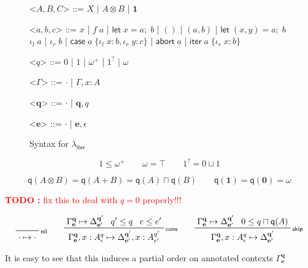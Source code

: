 \documentclass[acmsmall,screen,review]{acmart}
\newcounter{todos}
\newcommand{\TODO}[1]{{
  \stepcounter{todos}
  \begin{center}\large{\textcolor{red}{\textbf{TODO \arabic{todos}:} #1}}\end{center}
}}
\newcommand{\mb}[1]{\ensuremath{\mathbf{#1}}}
\newcommand{\ms}[1]{\ensuremath{\mathsf{#1}}}
\newcommand{\lto}{:}
\newcommand{\linl}[1]{\iota_l\;{#1}}
\newcommand{\linr}[1]{\iota_r\;{#1}}
\newcommand{\labort}[1]{\ms{abort}\;{#1}}
\newcommand{\letexpr}[3]{\ensuremath{\ms{let}\;#1 = #2;\;#3}}
\newcommand{\caseexpr}[5]{\ms{case}\;#1\;\{\linl{#2} \lto #3, \linr{#4} \lto #5\}}
\newcommand{\liter}[3]{\ms{iter}\;#1\;\{ \linr{#2} \lto #3 \}}
\newcommand{\cwk}[2]{#1 \mapsto #2}
\newcommand{\rle}[1]{{\scriptsize\textsf{#1}}}
\newcommand{\subiterssa}{\(\lambda_{\ms{iter}}\)}
\newcommand{\zeroq}{0}
\newcommand{\oneq}{1}
\newcommand{\delq}{1^?}
\newcommand{\cpyq}{\omega^+}
\newcommand{\topq}{\omega}
\newcommand{\alquant}{\ms{q}}
\begin{document}
\begin{figure}
  \begin{grammar}
    <\(A, B, C\)> ::= 
    \(X\)
    \;|\; \(A \otimes B\)
    \;|\; \(\mathbf{1}\)

    <\(a, b, c\)> ::=
    \(x\)
    \;|\; \(f\;a\)
    \;|\; \(\letexpr{x}{a}{b}\)
    \;|\; \(()\)
    \;|\; \((a, b)\)
    \;|\; \(\letexpr{(x, y)}{a}{b}\)
    \alt  \(\linl{a}\)
    \;|\; \(\linr{b}\)
    \;|\; \(\caseexpr{a}{x}{b}{y}{c}\)
    \;|\; \(\labort{a}\)
    \;|\; \(\liter{a}{x}{b}\)
    
    <\(q\)> ::= \(\zeroq\) | \(\oneq\) | \(\cpyq\) | \(\delq\) | \(\topq\)

    <\(\Gamma\)> ::= \(\cdot\) \;|\; \(\Gamma, x : A\)

    <\(\mb{q}\)> ::= \(\cdot\) \;|\; \(\mb{q}, q\)

    <\(\mb{e}\)> ::= \(\cdot\) \;|\; \(\mb{e}, \epsilon\)
  \end{grammar}
  \caption{Syntax for \subiterssa}
  \label{fig:subiterssa-syntax}
\end{figure}

\begin{equation}
  \oneq \leq \cpyq \qquad \topq = \top \qquad \delq = \zeroq \sqcup \oneq
\end{equation}

\begin{equation}
  \alquant(A \otimes B) = \alquant(A + B) = \alquant(A) \sqcap \alquant(B) \qquad
  \alquant(\mb{1}) = \alquant(\mb{0}) = \topq
\end{equation}

\TODO{fix this to deal with $q = 0$ properly!!!}

\begin{gather*}
  \prftree[r]{\rle{nil}}{\cwk{\cdot}{\cdot}} \qquad 
  \prftree[r]{\rle{cons}}
    {\cwk{\Gamma^{\mb{q}}_{\mb{e}}}{\Delta^{\mb{q}'}_{\mb{e}'}}}
    {q' \leq q}
    {e \leq e'}
    {\cwk{\Gamma^{\mb{q}}_{\mb{e}}, x : A^q_\epsilon}
         {\Delta^{\mb{q}'}_{\mb{e}'}, x : A^{q'}_{\epsilon'}}} \qquad
  \prftree[r]{\rle{skip}}
    {\cwk{\Gamma^{\mb{q}}_{\mb{e}}}{\Delta^{\mb{q}'}_{\mb{e}'}}}
    {\zeroq \leq q \sqcap \alquant(A)}
    {\cwk{\Gamma^{\mb{q}}_{\mb{e}}, x : A^q_\epsilon}{\Delta}^{\mb{q}'}_{\mb{e}'}}
\end{gather*}

It is easy to see that this induces a partial order on annotated contexts $\Gamma^{\mb{q}}_{\mb{e}}$
\end{document}
